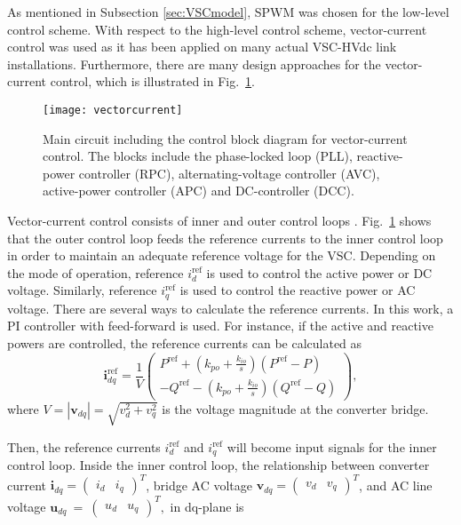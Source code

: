 \documentclass[conference]{IEEEtran}
\begin{document}
As mentioned in Subsection \ref{sec:VSCmodel}, SPWM was chosen for the low-level control scheme. With respect to the high-level control scheme, vector-current control was used as it has been applied on many actual VSC-HVdc link installations. Furthermore, there are many design approaches for the vector-current control, which is illustrated in Fig.~\ref{vectorcurrent}. 
\begin{figure}
\centering
\texttt{[image: vectorcurrent]}
\caption{Main circuit including the control block diagram for vector-current control. The blocks include the phase-locked loop (PLL), reactive-power controller (RPC), alternating-voltage controller (AVC), active-power controller (APC) and DC-controller (DCC).\cite{Robert}}
\label{vectorcurrent}
\end{figure} 

Vector-current control consists of inner and outer control loops \cite{NTNU}\cite{Robert}. Fig.~\ref{vectorcurrent} shows that the outer control loop feeds the reference currents to the inner control loop in order to maintain an adequate reference voltage for the VSC. Depending on the mode of operation, reference $i_d^{\text{ref}}$ is used to control the active power or DC voltage. Similarly, reference $i_q^{\text{ref}}$ is used to control the reactive power or AC voltage. There are several ways to calculate the reference currents. In this work, a PI controller with feed-forward is used. For instance, if the active and reactive powers are controlled, the reference currents can be calculated as
\begin{equation}
\label{eq:feedforward}
\mathbf{i}_{dq}^{\text{ref}}=\frac{1}{V}\begin{pmatrix}P^{\text{ref}}+(k_{po}+\frac{\displaystyle k_{io}}{s})(P^{\text{ref}}-P)\\
 -Q^{\text{ref}}-(k_{po}+\frac{\displaystyle k_{io}}{s})(Q^{\text{ref}}-Q)
\end{pmatrix},
\end{equation} 
where $V=|\mathbf{v}_{dq}|=\sqrt{v_d^2+v_q^2}$ is the voltage magnitude at the converter bridge.

Then, the reference currents $i_d^{\text{ref}}$ and $i_q^{\text{ref}}$ will become input signals for the inner control loop. Inside the inner control loop, the relationship between converter current $\mathbf{i}_{dq}=\begin{pmatrix}
i_d & i_q
\end{pmatrix}^T$, bridge AC voltage $\mathbf{v}_{dq}=\begin{pmatrix}
v_d & v_q
\end{pmatrix}^T$, and AC line voltage $\mathbf{u}_{dq}~=~\begin{pmatrix}
u_d & u_q
\end{pmatrix}^T,$ in dq-plane is
\end{document}
